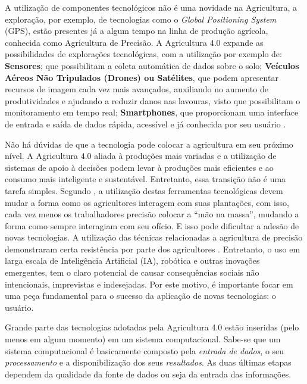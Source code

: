 \documentclass[12pt]{article}
\begin{document}
A utilização de componentes tecnológicos não é uma novidade na Agricultura, a exploração, por exemplo, de tecnologias como o \textit{Global Positioning System} (GPS), estão presentes já a algum tempo na linha de produção agrícola, conhecida como Agricultura de Precisão. A Agricultura 4.0 expande as possibilidades de explorações tecnológicas, com a utilização por exemplo de: \textbf{Sensores}; que possibilitam a coleta automática de dados sobre o solo; \textbf{Veículos Aéreos Não Tripulados (Drones) ou Satélites}, que podem apresentar recursos de imagem cada vez mais avançados, auxiliando no aumento de produtividades e ajudando a reduzir danos nas lavouras, visto que possibilitam o monitoramento em tempo real; \textbf{Smartphones}, que proporcionam uma interface de entrada e saída de dados rápida, acessível e já conhecida por seu usuário \cite{digital-agriculture}.

Não há dúvidas de que a tecnologia pode colocar a agricultura em seu próximo nível. A Agricultura 4.0 aliada à produções mais variadas e a utilização de sistemas de apoio à decisões podem levar à produções mais eficientes e ao consumo mais inteligente e sustentável. Entretanto, essa transição não é uma tarefa simples. Segundo \cite{agriculture-40-rose}, a utilização destas ferramentas tecnológicas devem mudar a forma como os agricultores interagem com suas plantações, com isso, cada vez menos os trabalhadores precisão colocar a ``mão na massa'', mudando a forma como sempre interagiam com seu ofício. E isso pode dificultar a adesão de novas tecnologias. A utilização das técnicas relacionadas a agricultura de precisão demonstraram certa resistência por parte dos agricultores \cite{agriculture-40-rose}. Entretanto, o uso em larga escala de Inteligência Artificial (IA), robótica e outras inovações emergentes, tem o claro potencial de causar consequências sociais não intencionais, imprevistas e indesejadas. Por este motivo, é importante focar em uma peça fundamental para o sucesso da aplicação de novas tecnologias: o usuário.

Grande parte das tecnologias adotadas pela Agricultura 4.0 estão inseridas (pelo menos em algum momento) em um sistema computacional. Sabe-se que um sistema computacional é basicamente composto pela \textit{entrada de dados}, o seu \textit{processamento} e a disponibilização dos seus \textit{resultados}. As duas últimas etapas dependem da qualidade da fonte de dados ou seja da entrada das informações. \cite{GTORRES:2013}
\end{document}

